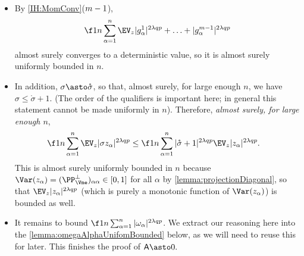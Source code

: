 \documentclass[main.tex]{subfiles}
\begin{document}
  \begin{itemize}
      \item
          By \ref{IH:MomConv}($m-1$),
          \[
          \f 1 n
              \sum_{\alpha=1}^n
                  \EV_z 
                      |g^1_\alpha|^{2 \lambda q p} + \ldots + |g^{\MM-1}_\alpha|^{2 \lambda q p}
          \]
          almost surely converges to a deterministic value, so it is almost surely uniformly bounded in $n$.
  
      \item
          In addition, $\sigma \asto \mathring \sigma$, so that, almost surely, for large enough $n$, we have $\sigma \le \mathring \sigma + 1$.
          (The order of the qualifiers is important here; in general this statement cannot be made uniformly in $n$).
          Therefore, \emph{almost surely, for large enough $n$},
          \begin{align*}
          \f 1 n
              \sum_{\alpha=1}^n
              \EV_z |\sigma \rvec_\alpha|^{2 \lambda q p}
          &\le
              \f 1 n
              \sum_{\alpha=1}^n
                  |\mathring \sigma + 1|^{2\lambda q p}
                  \EV_z |\rvec_\alpha|^{2 \lambda q p}
                  .
          \end{align*}
          This is almost surely uniformly bounded in $n$ because $\Var(\rvec_\alpha) = (\PP_{\Vme}^\perp)_{\alpha\alpha} \in [0, 1]$ for all $\alpha$ by \cref{lemma:projectionDiagonal}, so that $\EV_z |\rvec_\alpha|^{2 \lambda q p}$ (which is purely a monotonic function of $\Var(z_\alpha)$) is bounded as well.
      \item
          It remains to bound $\f 1 n \sum_{\alpha=1}^n |\omega_\alpha|^{2\lambda q p}$.
          We extract our reasoning here into the \cref{lemma:omegaAlphaUnifomBounded} below, as we will need to reuse this for later.
          This finishes the proof of $\probA\asto 0.$
  
  \end{itemize}
\end{document}
